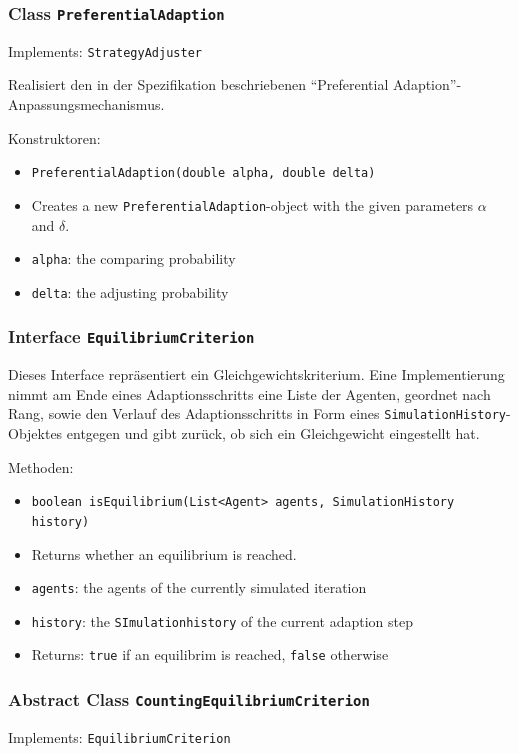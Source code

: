 \documentclass[parskip=full,11pt]{scrartcl}
\begin{document}
\subsubsection{Class \texttt{PreferentialAdaption}}
Implements: \texttt{StrategyAdjuster}

Realisiert den in der Spezifikation beschriebenen \enquote{Preferential Adaption}-Anpassungsmechanismus.

Konstruktoren:
\begin{itemize}\itemsep -10pt
\item \texttt{PreferentialAdaption(double alpha, double delta)}
\item[] Creates a new \texttt{PreferentialAdaption}-object with the given parameters \(\alpha\) and \(\delta\).
\item[] \texttt{alpha}: the comparing probability
\item[] \texttt{delta}: the adjusting probability
\end{itemize}

\subsubsection{Interface \texttt{EquilibriumCriterion}}
Dieses Interface repräsentiert ein Gleichgewichtskriterium. Eine Implementierung nimmt am Ende eines Adaptionsschritts eine Liste der Agenten, geordnet nach Rang, sowie den Verlauf des Adaptionsschritts in Form eines \texttt{SimulationHistory}-Objektes entgegen und gibt zurück, ob sich ein Gleichgewicht eingestellt hat.

Methoden:
\begin{itemize}\itemsep -10pt
\item \texttt{boolean isEquilibrium(List<Agent> agents, SimulationHistory history)}
\item[] Returns whether an equilibrium is reached.
\item[] \texttt{agents}: the agents of the currently simulated iteration
\item[] \texttt{history}: the \texttt{SImulationhistory} of the current adaption step
\item[] Returns: \texttt{true} if an equilibrim is reached, \texttt{false} otherwise
\end{itemize}

\subsubsection{Abstract Class \texttt{CountingEquilibriumCriterion}}
Implements: \texttt{EquilibriumCriterion}
\end{document}
